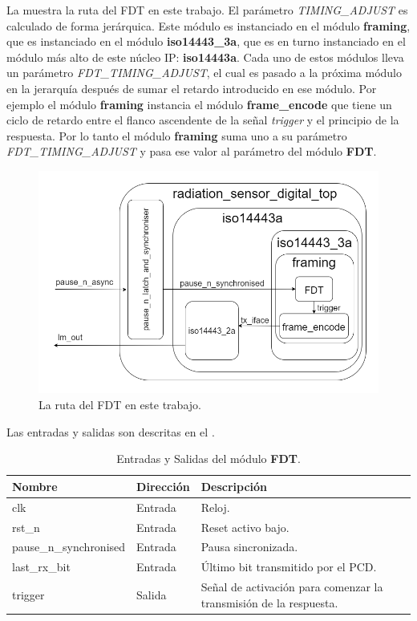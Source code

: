\documentclass[a4paper, twoside, 11pt]{report}
\begin{document}
La  muestra la ruta del FDT en este trabajo. El parámetro \textit{TIMING\_ADJUST} es calculado de forma jerárquica. Este módulo es instanciado en el módulo \textbf{framing}, que es instanciado en el módulo \textbf{iso14443\_3a}, que es en turno instanciado en el módulo más alto de este núcleo IP: \textbf{iso14443a}. Cada uno de estos módulos lleva un parámetro \textit{FDT\_TIMING\_ADJUST}, el cual es pasado a la próxima módulo en la jerarquía después de sumar el retardo introducido en ese módulo. Por ejemplo el módulo \textbf{framing} instancia el módulo \textbf{frame\_encode} que tiene un ciclo de retardo entre el flanco ascendente de la señal \textit{trigger} y el principio de la respuesta. Por lo tanto el módulo \textbf{framing} suma uno a su parámetro \textit{FDT\_TIMING\_ADJUST} y pasa ese valor al parámetro del módulo \textbf{FDT}.

\begin{figure}[htb]
  \centering
  \includegraphics[width=1.0\textwidth]{./img/fdt_path3.drawio}
  \caption{La ruta del FDT en este trabajo.}
  \label{fig:fdt_path}
\end{figure}

Las entradas y salidas son descritas en el .

\begin{table}[htb]
  \centering
  \tablezebra
  \begin{tabulary}{\linewidth}{l|l|L}
    \setcounter{rownum}{0}
    \textbf{Nombre}&\textbf{Dirección}&\textbf{Descripción} \\
    \hline
    clk&Entrada&Reloj. \\
    rst\_n&Entrada&Reset activo bajo. \\
    pause\_n\_synchronised&Entrada&Pausa sincronizada. \\
    last\_rx\_bit&Entrada&Último bit transmitido por el PCD. \\
    trigger&Salida&Señal de activación para comenzar la transmisión de la respuesta. \\
  \end{tabulary}
  \caption{Entradas y Salidas del módulo \textbf{FDT}.}
  \label{tab:ports_fdt}
\end{table}
\end{document}
